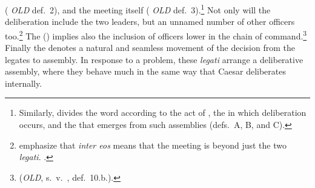 \documentclass[12pt,letterpaper,oneside,final]{memoir}
\begin{document}
(  \emph{OLD} def.~2), and the meeting itself (  \emph{OLD} def.~3).\footnote{Similarly, \textcite{meusel1887} divides the word according to the act of , the  in which deliberation occurs, and the  that emerges from such assemblies (defs.~A, B, and C).} Not only will the deliberation include the two leaders, but an unnamed number of other officers too.\footnote{\textcite{kranerdittenbergermeusel1967} emphasize that \emph{\textlatin{inter eos}} means that the meeting is beyond just the two \emph{legati}. .} The  () implies also the inclusion of officers lower in the chain of command.\footnote{ (\emph{OLD}, s.~v.~, def.~10.b.).} Finally the  denotes a natural and seamless movement of the decision from the legates to assembly. In response to a problem, these \emph{legati} arrange a deliberative assembly, where they behave much in the same way that Caesar deliberates internally.
\end{document}
